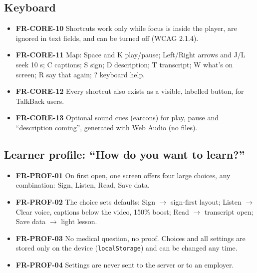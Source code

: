\documentclass[11pt,a4paper]{article}
\newcommand{\code}[1]{\texttt{#1}}
\newcommand{\req}[1]{\textbf{#1}}
\begin{document}
\subsection{Keyboard}
\begin{itemize}
  \item \req{FR-CORE-10} Shortcuts work only while focus is inside the player, are ignored in text fields, and can be turned off (WCAG 2.1.4).
  \item \req{FR-CORE-11} Map: Space and K play/pause; Left/Right arrows and J/L seek 10 s; C captions; S sign; D description; T transcript; W what's on screen; R say that again; ? keyboard help.
  \item \req{FR-CORE-12} Every shortcut also exists as a visible, labelled button, for TalkBack users.
  \item \req{FR-CORE-13} Optional sound cues (earcons) for play, pause and ``description coming'', generated with Web Audio (no files).
\end{itemize}

\subsection{Learner profile: ``How do you want to learn?''}
\begin{itemize}
  \item \req{FR-PROF-01} On first open, one screen offers four large choices, any combination: Sign, Listen, Read, Save data.
  \item \req{FR-PROF-02} The choice sets defaults: Sign $\rightarrow$ sign-first layout; Listen $\rightarrow$ Clear voice, captions below the video, 150\% boost; Read $\rightarrow$ transcript open; Save data $\rightarrow$ light lesson.
  \item \req{FR-PROF-03} No medical question, no proof. Choices and all settings are stored only on the device (\code{localStorage}) and can be changed any time.
  \item \req{FR-PROF-04} Settings are never sent to the server or to an employer.
\end{itemize}
\end{document}
